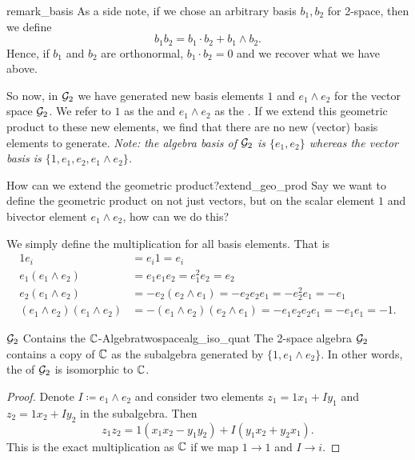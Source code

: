 \begin{remark}{}{remark_basis}
As a side note, if we chose an arbitrary basis $b_1, b_2$ for 2-space, then we define
\[
b_1b_2 = b_1\cdot b_2 + b_1\wedge b_2.
\]
Hence, if $b_1$ and $b_2$ are orthonormal, $b_1\cdot b_2=0$ and we recover what we have above.
\end{remark}

So now, in $\mathcal{G}_2$ we have generated new basis elements $1$ and $e_1\wedge e_2$ for the vector space $\mathcal{G}_2$. We refer to $1$ as the  and $e_1\wedge e_2$ as the . If we extend this geometric product to these new elements, we find that there are no new (vector) basis elements to generate. \emph{Note: the algebra basis of $\mathcal{G}_2$ is $\{e_1,e_2\}$ whereas the vector basis is $\{1,e_1,e_2,e_1\wedge e_2\}$.} 

\begin{ques}{How can we extend the geometric product?}{extend_geo_prod}
Say we want to define the geometric product on not just vectors, but on the scalar element $1$ and bivector element $e_1\wedge e_2$, how can we do this?
\tcblower
\begin{answer*}
We simply define the multiplication for all basis elements.  That is
\begin{align*}
    1 e_i &= e_i 1 = e_i\\
    e_1 (e_1 \wedge e_2)&=e_1e_1e_2 = e_1^2 e_2 = e_2\\
    e_2 (e_1 \wedge e_2)&= -e_2 (e_2\wedge e_1)=-e_2e_2 e_1 = -e_2^2e_1=-e_1\\
    (e_1\wedge e_2)(e_1\wedge e_2)&= -(e_1\wedge e_2)(e_2\wedge e_1)=-e_1e_2e_2e_1=-e_1e_1=-1.
\end{align*}
\end{answer*}
\end{ques}



\begin{prop}{$\mathcal{G}_2$ Contains the $\mathbb{C}$-Algebra}{twospacealg_iso_quat}
    The 2-space algebra $\mathcal{G}_2$ contains a copy of $\mathbb{C}$ as the subalgebra generated by $\{1, e_1\wedge e_2\}$. In other words, the \emph{} of $\mathcal{G}_2$ is isomorphic to $\mathbb{C}$.
    \tcblower
    \begin{proof}
    Denote $I\coloneqq e_1\wedge e_2$ and consider two elements $z_1=1x_1+Iy_1$ and $z_2=1x_2+Iy_2$ in the subalgebra. Then
    \[
    z_1 z_2 = 1(x_1x_2 - y_1y_2)+I(y_1x_2+y_2x_1).
    \]
    This is the exact multiplication as $\mathbb{C}$ if we map $1\to 1$ and $I \to i$.  
    \end{proof}
\end{prop}


